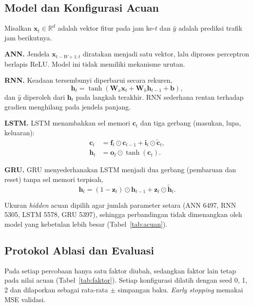 \documentclass[conference,a4paper]{IEEEtran}
\begin{document}
\subsection{Model dan Konfigurasi Acuan}
Misalkan $\mathbf{x}_t\in\mathbb{R}^d$ adalah vektor fitur pada jam ke-$t$ dan $\hat{y}$ adalah prediksi trafik jam berikutnya.
 
\textbf{ANN.} Jendela $\mathbf{x}_{t-W+1:t}$ diratakan menjadi satu vektor, lalu diproses perceptron berlapis ReLU. Model ini tidak memiliki mekanisme urutan.
 
\textbf{RNN.} Keadaan tersembunyi diperbarui secara rekuren,
\begin{equation}
\mathbf{h}_t=\tanh(\mathbf{W}_x\mathbf{x}_t+\mathbf{W}_h\mathbf{h}_{t-1}+\mathbf{b}),
\end{equation}
dan $\hat{y}$ diperoleh dari $\mathbf{h}_t$ pada langkah terakhir. RNN sederhana rentan terhadap gradien menghilang pada jendela panjang.
 
\textbf{LSTM.} LSTM \cite{hochreiter1997lstm} menambahkan sel memori $\mathbf{c}_t$ dan tiga gerbang (masukan, lupa, keluaran):
\begin{align}
\mathbf{c}_t&=\mathbf{f}_t\odot\mathbf{c}_{t-1}+\mathbf{i}_t\odot\tilde{\mathbf{c}}_t,\\
\mathbf{h}_t&=\mathbf{o}_t\odot\tanh(\mathbf{c}_t).
\end{align}
 
\textbf{GRU.} GRU \cite{cho2014gru} menyederhanakan LSTM menjadi dua gerbang (pembaruan dan reset) tanpa sel memori terpisah,
\begin{equation}
\mathbf{h}_t=(1-\mathbf{z}_t)\odot\mathbf{h}_{t-1}+\mathbf{z}_t\odot\tilde{\mathbf{h}}_t.
\end{equation}
 
Ukuran \textit{hidden} acuan dipilih agar jumlah parameter setara (ANN 6497, RNN 5305, LSTM 5578, GRU 5397), sehingga perbandingan tidak dimenangkan oleh model yang kebetulan lebih besar (Tabel~\ref{tab:acuan}).
 
\subsection{Protokol Ablasi dan Evaluasi}
Pada setiap percobaan hanya satu faktor diubah, sedangkan faktor lain tetap pada nilai acuan (Tabel~\ref{tab:faktor}). Setiap konfigurasi dilatih dengan seed 0, 1, 2 dan dilaporkan sebagai rata-rata $\pm$ simpangan baku. \textit{Early stopping} memakai MSE validasi.
 
\end{document}
